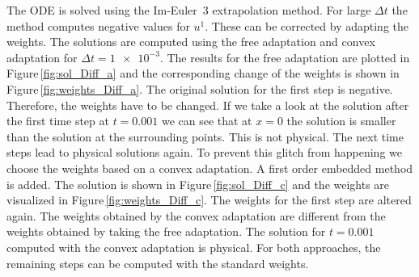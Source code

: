 \documentclass[a4paper]{article}
\numberwithin{equation}{section}
\theoremstyle{plain}
\theoremstyle{definition}
\numberwithin{theorem}{section}
\newcommand{\dt}{{\Delta t}}
\newcommand{\1}{\mathbbm{1}}
\begin{document}
The ODE is solved using the Im-Euler~3 extrapolation method.
For large $\dt$ the method computes negative values for $u^1$.
These can be corrected by adapting the weights.  
The solutions are computed using the free adaptation and convex adaptation for $\dt = \num{1e-3}$.
The results for the free adaptation are plotted in Figure\,\ref{fig:sol_Diff_a} and the corresponding change of the weights
is shown in Figure\,\ref{fig:weights_Diff_a}.
The original solution for the first step is negative. Therefore, the weights have to be changed. 
If we take a look at the solution after the first time step at $t=0.001$ we can see that at $x=0$ the solution is smaller than the solution at the surrounding points.  
This is not physical.  
The next time steps lead to physical solutions again. 
To prevent this glitch from happening we choose the weights based on a convex adaptation. 
A first order embedded method is added. The solution is shown in Figure\,\ref{fig:sol_Diff_c} and the weights are visualized in Figure\,\ref{fig:weights_Diff_c}.
The weights for the first step are altered again. 
The weights obtained by the convex adaptation are different from the weights obtained 
by taking the free adaptation. 
The solution for $t=0.001$ computed with the convex adaptation is physical. 
For both approaches, the remaining steps can be computed with the standard weights. 
\end{document}
